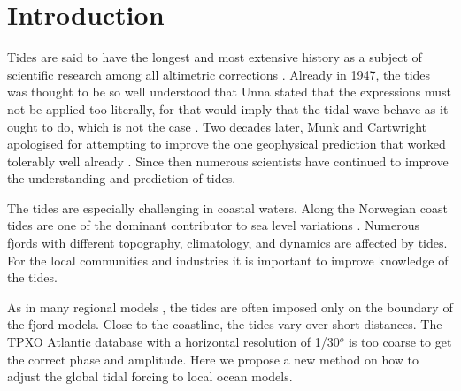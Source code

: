 \section{Introduction}

Tides are said to have the longest and most extensive history as a subject of scientific research among all altimetric corrections \cite[]{egbert94,cartwright77,hendershott81}. Already in 1947, the tides was thought to be so well understood that Unna stated that the expressions must not be applied too literally, for that would imply that the tidal wave behave as it ought to do, which is not the case \cite[]{unna47}. Two decades later, Munk and Cartwright apologised for attempting to improve the one geophysical prediction that worked tolerably well already \cite[]{munk66}. Since then numerous scientists have continued to improve the understanding and prediction of tides. 

The tides are especially challenging in coastal waters. Along the Norwegian coast tides are one of the dominant contributor to sea level variations \cite[]{grabbe09}. Numerous fjords with different topography, climatology, and dynamics are affected by tides. For the local communities and industries it is important to improve knowledge of the tides. 

As in many regional models \cite[]{gjevik89}, the tides are often imposed only on the boundary of the fjord models. Close to the coastline, the tides vary over short distances. The TPXO Atlantic database with a horizontal resolution of 1/30$^o$ \cite[]{egbert94,egbert02} is too coarse to get the correct phase and amplitude. Here we propose a new method on how to adjust the global tidal forcing to local ocean models. 
